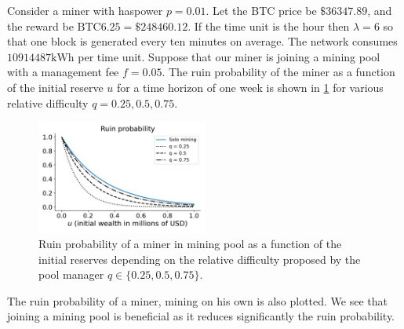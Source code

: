 \begin{ex}\label{ex:miner_in_pool}
Consider a miner with haspower $p = 0.01$. Let the BTC price be $\$36347.89$, and the reward be $\text{BTC}6.25 = \$248460.12$. If the time unit is the hour then $\lambda = 6$ so that one block is generated every ten minutes on average. The network consumes $10914487\text{kWh}$ per time unit. Suppose that our miner is joining a mining pool with a management fee $f = 0.05$. The ruin probability of the miner as a function of the initial reserve $u$ for a time horizon of one week is shown in \cref{fig:rp_miner_in_pool} for various relative difficulty $q = 0.25, 0.5, 0.75$.
\begin{figure}[!ht]
  \begin{center}
      \includegraphics[width = 0.5\textwidth]{../Figures/rp_miner_in_pool}
    \caption{Ruin probability of a miner in mining pool as a function of the initial reserves depending on the relative difficulty proposed by the pool manager $q\in \{0.25, 0.5, 0.75\}$.}
    \label{fig:rp_miner_in_pool}
  \end{center}
\end{figure}
The ruin probability of a miner, mining on his own is also plotted. We see that joining a mining pool is beneficial as it reduces significantly the ruin probability.
\end{ex}


